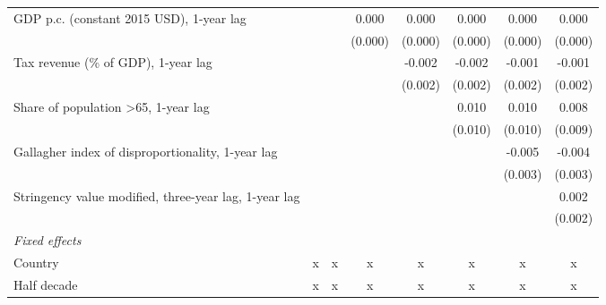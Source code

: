 \begin{table}[htbp]
\begin{tabular}{lccccccc}
      GDP p.c. (constant 2015 USD), 1-year lag                        &                &                & 0.000          & 0.000         & 0.000         & 0.000         & 0.000\\   
                                                                      &                &                & (0.000)        & (0.000)       & (0.000)       & (0.000)       & (0.000)\\   
      Tax revenue (\% of GDP), 1-year lag                             &                &                &                & -0.002        & -0.002        & -0.001        & -0.001\\   
                                                                      &                &                &                & (0.002)       & (0.002)       & (0.002)       & (0.002)\\   
      Share of population >65, 1-year lag                             &                &                &                &               & 0.010         & 0.010         & 0.008\\   
                                                                      &                &                &                &               & (0.010)       & (0.010)       & (0.009)\\   
      Gallagher index of disproportionality, 1-year lag               &                &                &                &               &               & -0.005        & -0.004\\   
                                                                      &                &                &                &               &               & (0.003)       & (0.003)\\   
      Stringency value modified, three-year lag, 1-year lag           &                &                &                &               &               &               & 0.002\\   
                                                                      &                &                &                &               &               &               & (0.002)\\   
      \emph{Fixed effects}\\
      Country                                                         & x              & x              & x              & x             & x             & x             & x\\  
      Half decade                                                     & x              & x              & x              & x             & x             & x             & x\\  

\end{tabular}
\end{table}
